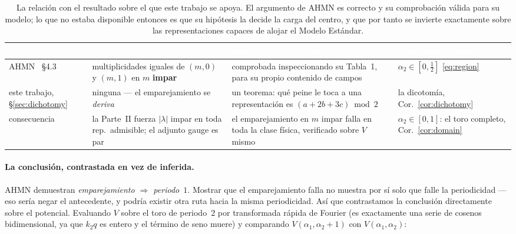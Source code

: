 \documentclass[11pt,a4paper]{article}
\newcommand{\lam}{|\lambda|}
\begin{document}
\begin{table}[t]
\centering\small
\begin{tabular}{p{2.5cm}p{4.6cm}p{4.3cm}p{3.0cm}}
\toprule
\rowcolor{hdrblue}
\textcolor{white}{} & \textcolor{white}{hipótesis} & \textcolor{white}{estado de esa hipótesis} & \textcolor{white}{conclusión extraída}\\
\midrule
AHMN~\cite{AHMN} \S4.3 &
multiplicidades iguales de $(m,0)$ y $(m,1)$ en $m$ \textbf{impar} &
comprobada inspeccionando su Tabla~1, para su propio contenido de campos &
$\alpha_2\in[0,\tfrac12]$ \eqref{eq:region}\\
\midrule
\rowcolor{softgrey}
este trabajo, \S\ref{sec:dichotomy} &
ninguna --- el emparejamiento se \emph{deriva} &
un teorema: qué peine le toca a una representación es $(a{+}2b{+}3c)\bmod2$ &
la dicotomía, Cor.~\ref{cor:dichotomy}\\
\midrule
consecuencia &
la Parte~II fuerza $\lam$ impar en toda rep.\ admisible; el adjunto gauge es par &
el emparejamiento en $m$ impar falla en toda la clase física, verificado sobre $V$ mismo &
$\alpha_2\in[0,1]$: el toro completo, Cor.~\ref{cor:domain}\\
\bottomrule
\end{tabular}
\caption{La relación con el resultado sobre el que este trabajo se apoya. El argumento de AHMN
es correcto y su comprobación válida para su modelo; lo que no estaba disponible entonces es
que su hipótesis la decide la carga del centro, y que por tanto se invierte exactamente sobre
las representaciones capaces de alojar el Modelo Estándar.}
\label{tab:vsahmn}
\end{table}

\paragraph{La conclusión, contrastada en vez de inferida.} AHMN demuestran
\emph{emparejamiento $\Rightarrow$ periodo~$1$}. Mostrar que el emparejamiento falla no
muestra por sí solo que falle la periodicidad --- eso sería negar el antecedente, y podría
existir otra ruta hacia la misma periodicidad. Así que contrastamos la conclusión
directamente sobre el potencial. Evaluando $V$ sobre el toro de periodo~$2$ por transformada
rápida de Fourier (es exactamente una serie de cosenos bidimensional, ya que $k_2q$ es entero
y el término de seno muere) y comparando $V(\alpha_1,\alpha_2{+}1)$ con
$V(\alpha_1,\alpha_2)$:
\end{document}
